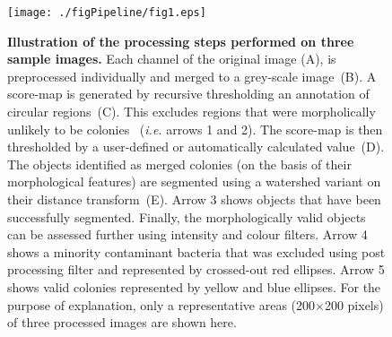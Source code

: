 \documentclass[10pt]{article}
\begin{document}
\begin{figure}[!ht]
\begin{center}
 \texttt{[image: ./figPipeline/fig1.eps]}
\end{center}
\caption{{\bf Illustration of the processing steps performed on three sample images.}
Each channel of the original image (A), is preprocessed individually and merged
to a grey-scale image~(B).
A score-map is generated by recursive thresholding an annotation of circular regions~(C). 
This excludes regions that were morpholically unlikely to be colonies~
(\emph{i.e.} arrows 1 and 2).
The score-map is then thresholded by a user-defined or automatically calculated
value~(D).
The objects identified as merged colonies (on the basis of their morphological
features) are segmented using a watershed variant on their distance transform~(E).
Arrow 3 shows objects that have been successfully segmented. Finally, the morphologically valid objects can be assessed further using intensity and colour filters.
Arrow 4 shows a minority contaminant bacteria that was excluded using post processing filter and represented by crossed-out red ellipses. 
Arrow 5 shows valid colonies represented by yellow and blue ellipses.
For the purpose of explanation, only a representative areas (200$\times{}$200 pixels)
of three processed images are shown here.}
\label{figPipeline}
\end{figure}

\newpage{}
\end{document}
